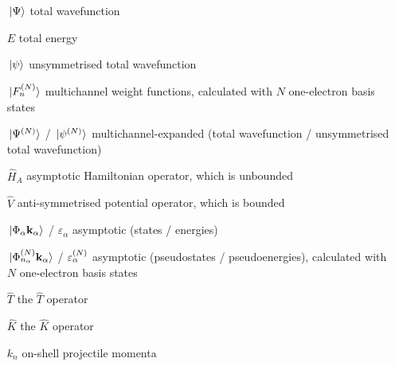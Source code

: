 \documentclass[]{article}
\begin{document}
\begin{itemize}
\item[$\ket*{\Psi}$]
  total wavefunction
\item[$E$]
  total energy
\item[$\ket*{\psi}$]
  unsymmetrised total wavefunction
\item[$\ket*{F_{n}^{(N)}}$]
  multichannel weight functions, calculated with $N$ one-electron basis states
\item[$\ket*{\Psi^{(N)}}$ / $\ket*{\psi^{(N)}}$]
  multichannel-expanded (total wavefunction / unsymmetrised total wavefunction)


\item[$\hat{H}_{A}$]
  asymptotic Hamiltonian operator, which is unbounded
\item[$\hat{V}$]
  anti-symmetrised potential operator, which is bounded
\item[$\ket*{\Phi_{\alpha} \vb{k}_{\alpha}}$ / $\varepsilon_{\alpha}$]
  asymptotic (states / energies)
\item[$\ket*{\Phi_{n_{\alpha}}^{(N)} \vb{k}_{\alpha}}$
  / $\varepsilon_{\alpha}^{(N)}$]
  asymptotic (pseudostates / pseudoenergies), calculated with $N$ one-electron
  basis states
\item[$\hat{T}$]
  the $\hat{T}$ operator
\item[$\hat{K}$]
  the $\hat{K}$ operator
\item[$k_{n}$]
  on-shell projectile momenta


\end{itemize}
\end{document}
